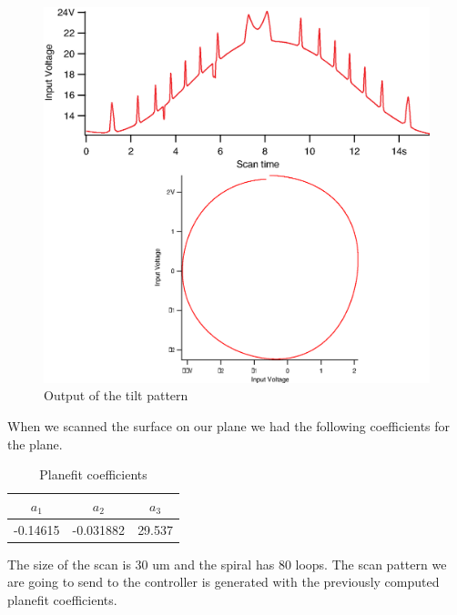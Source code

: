 \begin{figure}[H]
  \centering
  \includegraphics[scale=0.1]{images/tiltcircles.eps}
    \caption{Output of the tilt pattern}
  \label{tiltcircle}
\end{figure}

When we scanned the surface on our plane we had the following coefficients for the plane.


\begin{table}[H]
\caption{Planefit coefficients} %
\centering %
\begin{tabular}{c c c} %
\hline\hline %
$a_1$ & $a_2$ & $a_3$ \\ [0.5ex] %
\hline %
-0.14615  & -0.031882 & 29.537 \\[1ex]

\hline %
\end{tabular}
\label{table:planefit} %
\end{table}

The size of the scan is 30 um and the spiral has 80 loops. The scan pattern we are going to send to the controller is generated with the previously computed planefit coefficients. 

